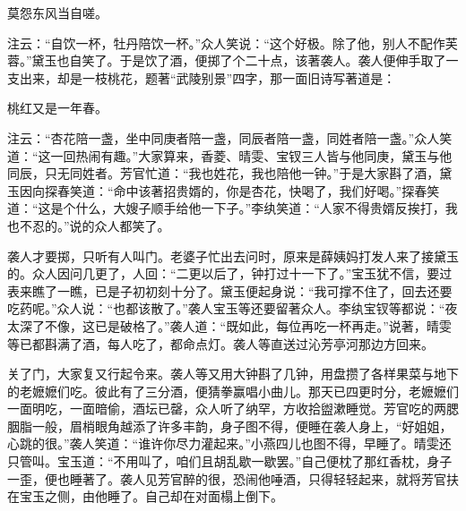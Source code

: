 \begin{poem}
    \begin{pl}莫怨东风当自嗟。
    \end{pl}
\end{poem}


\begin{parag}
    注云：“自饮一杯，牡丹陪饮一杯。”众人笑说：“这个好极。除了他，别人不配作芙蓉。”黛玉也自笑了。于是饮了酒，便掷了个二十点，该著袭人。袭人便伸手取了一支出来，却是一枝桃花，题著“武陵别景”四字，那一面旧诗写著道是：
\end{parag}


\begin{poem}
    \begin{pl}桃红又是一年春。
    \end{pl}
\end{poem}


\begin{parag}
    注云：“杏花陪一盏，坐中同庚者陪一盏，同辰者陪一盏，同姓者陪一盏。”众人笑道：“这一回热闹有趣。”大家算来，香菱、晴雯、宝钗三人皆与他同庚，黛玉与他同辰，只无同姓者。芳官忙道：“我也姓花，我也陪他一钟。”于是大家斟了酒，黛玉因向探春笑道：“命中该著招贵婿的，你是杏花，快喝了，我们好喝。”探春笑道：“这是个什么，大嫂子顺手给他一下子。”李纨笑道：“人家不得贵婿反挨打，我也不忍的。”说的众人都笑了。
\end{parag}


\begin{parag}
    袭人才要掷，只听有人叫门。老婆子忙出去问时，原来是薛姨妈打发人来了接黛玉的。众人因问几更了，人回：“二更以后了，钟打过十一下了。”宝玉犹不信，要过表来瞧了一瞧，已是子初初刻十分了。黛玉便起身说：“我可撑不住了，回去还要吃药呢。”众人说：“也都该散了。”袭人宝玉等还要留著众人。李纨宝钗等都说：“夜太深了不像，这已是破格了。”袭人道：“既如此，每位再吃一杯再走。”说著，晴雯等已都斟满了酒，每人吃了，都命点灯。袭人等直送过沁芳亭河那边方回来。
\end{parag}


\begin{parag}
    关了门，大家复又行起令来。袭人等又用大钟斟了几钟，用盘攒了各样果菜与地下的老嬷嬷们吃。彼此有了三分酒，便猜拳赢唱小曲儿。那天已四更时分，老嬷嬷们一面明吃，一面暗偷，酒坛已罄，众人听了纳罕，方收拾盥漱睡觉。芳官吃的两腮胭脂一般，眉梢眼角越添了许多丰韵，身子图不得，便睡在袭人身上，“好姐姐，心跳的很。”袭人笑道：“谁许你尽力灌起来。”小燕四儿也图不得，早睡了。晴雯还只管叫。宝玉道：“不用叫了，咱们且胡乱歇一歇罢。”自己便枕了那红香枕，身子一歪，便也睡著了。袭人见芳官醉的很，恐闹他唾酒，只得轻轻起来，就将芳官扶在宝玉之侧，由他睡了。自己却在对面榻上倒下。
\end{parag}


